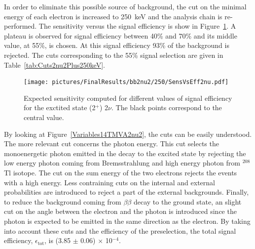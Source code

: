 \documentclass[main.tex]{subfiles}
\begin{document}
\bigskip


\NI In order to eliminate this possible source of background, the cut on the minimal energy of each electron is increased to 250~keV and the analysis chain is re-performed. The sensitivity versus the signal efficiency is show in Figure~\ref{plot:SensVsEff_250}. A plateau is observed for signal efficiency between 40\% and 70\% and its middle value, at 55\%, is chosen. At this signal efficiency 93\% of the background is rejected. The cuts corresponding to the 55\% signal selection are given in Table~\ref{tab:Cuts2nu2Plus250keV}.


\begin{figure} [h!]
\begin{center}
\texttt{[image: pictures/FinalResults/bb2nu2/250/SensVsEff2nu.pdf]}
\end{center}
\caption{Expected sensitivity computed for different values of signal efficiency for the exctited state (2$^+$) 2$\nu$. The black points correspond to the central value.}
\label{plot:SensVsEff_250}
\end{figure}


\bigskip


\NI By looking at Figure~\ref{Variables14TMVA2nu2}, the cuts can be easily understood. The more relevant cut concerns the photon energy. This cut selects the monoenergetic photon emitted in the decay to the excited state by rejecting the low energy photon coming from Bremsstrahlung and high energy photon from $^{\text{208}}$Tl isotope. The cut on the sum energy of the two electrons rejects the events with a high energy. Less contraining cuts on the internal and external probabilities are introduced to reject a part of the external backgrounds. Finally, to reduce the background coming from $\beta\beta$ decay to the ground state, an slight cut on the angle between the electron and the photon is introduced since the photon is expected to be emitted in the same direction as the electron. By taking into account these cuts and the efficiency of the preselection, the total signal efficiency, $\epsilon_{\text{tot}}$, is (3.85 $\pm$ 0.06) $\times$ 10$^{-\text{4}}$. 


\FloatBarrier
\end{document}
